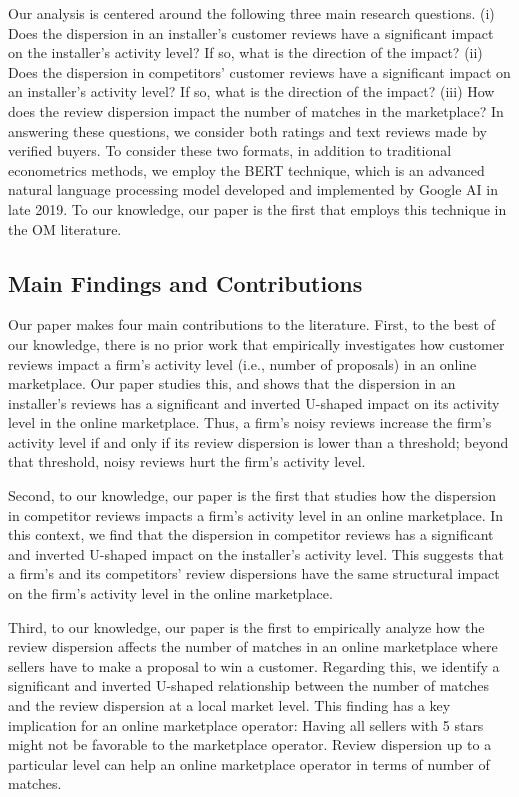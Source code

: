 \documentclass[msom,blindrev]{informs3}
\begin{document}
	Our analysis is centered around the following three main research questions. (i) Does the dispersion in an installer's customer reviews have a significant impact on the installer's activity level?  If so, what is the direction of the impact? (ii) Does the dispersion in competitors' customer reviews have a significant impact on an installer's activity level? If so, what is the direction of the impact? (iii) How does the review dispersion impact the number of matches in the marketplace?  In answering these questions, we consider both  ratings and text reviews made by verified buyers. To consider these two formats, in addition to traditional econometrics methods, we employ the BERT technique, which is an advanced natural language processing model developed and implemented by Google AI in late 2019. To our knowledge, our paper is the first that employs this technique in the OM literature.
	
	
	\subsection{Main Findings and Contributions}
	
	Our paper makes four main contributions to the literature. First, to the best of our knowledge, there is no prior work that empirically investigates how customer reviews impact a firm's activity level (i.e., number of proposals) in an online marketplace. Our paper studies this, and shows that the dispersion in an installer's reviews has a significant and inverted U-shaped impact on its activity level in the online marketplace. Thus, a firm's noisy reviews increase the firm's activity level if and only if its review dispersion is lower than a threshold; beyond that threshold, noisy reviews hurt the firm's activity level.
	
	
	Second, to our knowledge, our paper is the first that studies how the dispersion in competitor reviews impacts a firm's activity level in an online marketplace. In this context, we find that the dispersion in competitor reviews has a significant and inverted U-shaped impact on the installer's activity level. This suggests that a firm's  and  its competitors' review dispersions have the same structural impact on the firm's activity level in the online marketplace.
	
	Third, to our knowledge, our paper is the first to empirically analyze how the review dispersion affects the number of matches in an online marketplace where sellers have to make a proposal to win a customer. Regarding this, we identify a significant and inverted U-shaped relationship between the number of matches and the review dispersion at a local market level. This finding has a key implication for an online marketplace operator: Having all sellers with 5 stars might not be favorable to the marketplace operator. Review dispersion up to a particular level can help an online marketplace operator in terms of number of matches.
	
\end{document}
